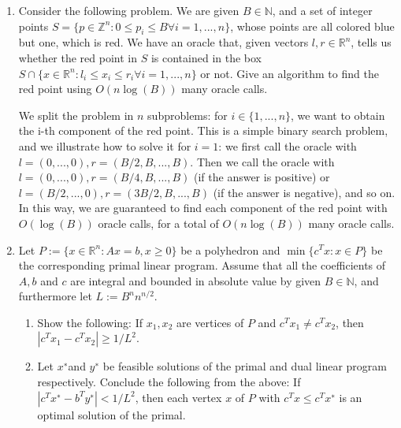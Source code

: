\documentclass[11pt]{article}
\institute{\'Ecole Polytechnique F\'ed\'erale de Lausanne}
\newcommand{\setR}{\mathbb{R}}
\newcommand{\setZ}{\mathbb{Z}}
\newcommand{\setN}{\mathbb{N}}
\begin{document}
\makeheader

\begin{enumerate}[1)]

\item Consider the following problem. We are given $B ∈\mathbb{N}$, and a set of integer points $S= \{p ∈\setZ^n :
0 ≤p_i ≤B ∀ i = 1,...,n\}$, whose points are all colored blue but one, which is red. We have an
oracle that, given vectors $l,r ∈\setR^n$, tells us whether the red point in $S$ is contained in the box
$S∩\{x ∈\setR^n : l_i ≤x_i ≤r_i ∀i = 1,...,n\}$ or not. Give an algorithm to find the red point using
$O(n \log(B))$ many oracle calls.


\begin{solution}
We split the problem in $n$ subproblems: for $i∈\{1,...,n\}$, we want to obtain the i-th component
of the red point. This is a simple binary search problem, and we illustrate how to solve it for $i= 1$:
we first call the oracle with $l = (0,...,0),r = (B/2,B,...,B)$. Then we call the oracle with $l=
(0,...,0),r = (B/4,B,...,B)$ (if the answer is positive) or $l = (B/2,...,0),r = (3B/2,B,...,B)$
(if the answer is negative), and so on. In this way, we are guaranteed to find each component of the
red point with $O(\log(B))$ oracle calls, for a total of $O(n\log(B))$ many oracle calls.
\end{solution}


\item Let $P := \{x ∈\setR^n : Ax= b, x ≥0\}$ be a polyhedron and $\min\{c^Tx : x ∈P\}$ be the corresponding
primal linear program. Assume that all the coeﬃcients of $A, b$ and $c$ are integral and bounded in
absolute value by given $B ∈\setN$, and furthermore let $L:= B^n n^{n/2}$.
\begin{enumerate}
\item Show the following: If $x_1,x_2$ are vertices of $P$ and $c^Tx_1\neq c^Tx_2$, then $|c^Tx_1−c^Tx_2|≥1/L^2$.
\item  Let $x^∗$and $y^∗$ be feasible solutions of the primal and dual linear program respectively. Conclude
the following from the above: If $|c^Tx^∗ −b^Ty^∗|<1/L^2$, then each vertex $x$ of $P$ with $c^Tx≤c^Tx^∗$ is
an optimal solution of the primal.
\end{enumerate}



\end{enumerate}
\end{document}
